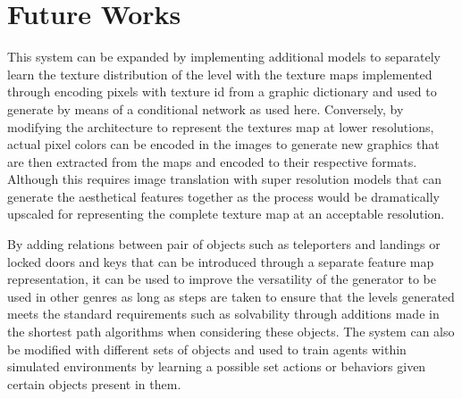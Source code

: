 \documentclass{Configuration_Files/PoliMi3i_thesis}
\begin{document}
\section{Future Works}
This system can be expanded by implementing additional models to separately learn 
the texture distribution of the level with the texture maps implemented through 
encoding pixels with texture id from a graphic dictionary and used to generate by 
means of a conditional network as used here. Conversely, by modifying the 
architecture to represent the textures map at lower resolutions, actual pixel colors can 
be encoded in the images to generate new graphics that are then extracted from the 
maps and encoded to their respective formats. Although this requires image 
translation with super resolution models \cite{XuW22} that can generate the aesthetical features
together as the process would be dramatically upscaled for representing the
complete texture map at an acceptable resolution. 

By adding relations between pair of objects such as teleporters and landings or 
locked doors and keys that can be introduced through a separate feature map
representation, it can be used to improve the versatility of the generator to be used in
other genres as long as steps are taken to ensure that the levels generated meets the 
standard requirements such as solvability through additions made in the shortest 
path algorithms when considering these objects. The system can also be modified
with different sets of objects and used to train agents within simulated environments 
by learning a possible set actions or behaviors given certain objects present in them.





\cleardoublepage
{} %
\appendix
\end{document}
